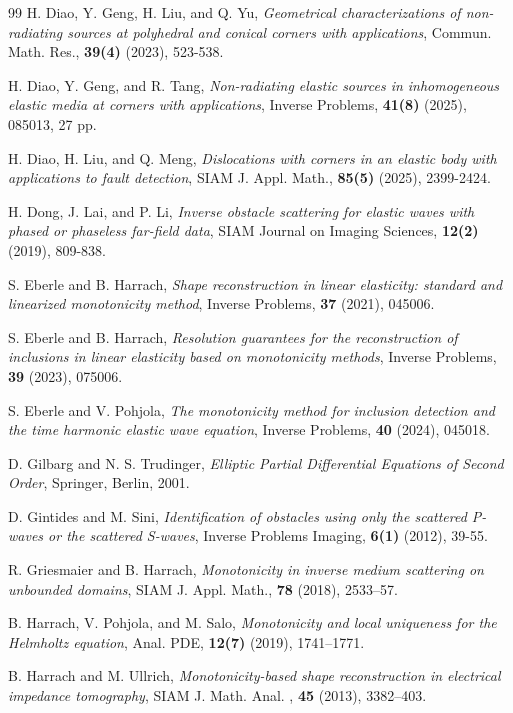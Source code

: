 \documentclass[11pt,reqno,twoside]{amsart}
\theoremstyle{definition}
\theoremstyle{remark}
\numberwithin{equation}{section}
\begin{document}
\begin{thebibliography}{99}
H. Diao, Y. Geng, H. Liu, and Q. Yu, {\it Geometrical characterizations of non-radiating sources at polyhedral and conical corners with applications}, Commun. Math. Res., \textbf{39(4)} (2023), 523-538.

H. Diao, Y. Geng, and R. Tang, {\it Non-radiating elastic sources in inhomogeneous elastic media at corners with applications}, Inverse Problems, \textbf{41(8)} (2025), 085013, 27 pp.

H. Diao, H. Liu, and Q. Meng, {\it Dislocations with corners in an elastic body with applications to fault detection}, SIAM J. Appl. Math., \textbf{85(5)} (2025), 2399-2424.

H. Dong, J. Lai, and P. Li, {\it Inverse obstacle scattering for elastic waves with phased or phaseless far-field data}, SIAM Journal on Imaging Sciences, \textbf{12(2)} (2019), 809-838.

S. Eberle and B. Harrach, {\it Shape reconstruction in linear elasticity: standard and linearized monotonicity method}, Inverse Problems, \textbf{37} (2021), 045006.

S. Eberle and B. Harrach, {\it Resolution guarantees for the reconstruction of inclusions in linear elasticity based on monotonicity methods}, Inverse Problems, \textbf{39} (2023), 075006.

S. Eberle and V. Pohjola, {\it The monotonicity method for inclusion detection and the time harmonic elastic wave equation}, Inverse Problems, \textbf{40} (2024), 045018.

D. Gilbarg and N. S. Trudinger, {\it Elliptic Partial Differential Equations of Second Order}, Springer, Berlin, 2001.

D. Gintides and M. Sini, {\it Identification of obstacles using only the scattered P-waves or the scattered S-waves}, Inverse Problems Imaging, \textbf{6(1)} (2012), 39-55.

 R. Griesmaier and B. Harrach, {\it Monotonicity in inverse medium scattering on unbounded domains}, SIAM J. Appl. Math., \textbf{78} (2018), 2533–57.

B. Harrach, V. Pohjola, and M. Salo, {\it Monotonicity and local uniqueness for the Helmholtz equation}, Anal. PDE, \textbf{12(7)} (2019), 1741–1771.

B. Harrach and M. Ullrich, {\it Monotonicity-based shape reconstruction in electrical impedance tomography}, SIAM J. Math. Anal. , \textbf{45} (2013), 3382–403.


\end{thebibliography}
\end{document}
